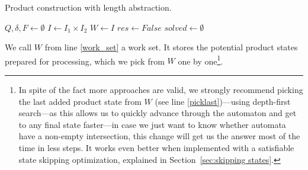 \begin{algorithm}[ht]
\caption{Product construction with length abstraction.}\label{productConstructionLengthAbstrAlg}
\DontPrintSemicolon
{}
\BlankLine
$Q, \delta, F \gets \emptyset$ \;
$I \gets I_1 \times I_2$ \;
$W \gets I$ \;\label{work_set}
$res \gets False$ \;\label{sat}
$solved \gets \emptyset$ \;\label{solved}
\end{algorithm}

We call $W$ from line \ref{work_set} a work set. It stores the potential product states prepared for processing, which we pick from $W$ one by one\footnote{In spite of the fact more approaches are valid, we strongly recommend picking the last added product state from $W$ (see line \ref{picklast})---using depth-first search---as this allows us to quickly advance through the automaton and get to any final state faster---in case we just want to know whether automata have a non-empty intersection, this change will get us the answer most of the time in less steps. It works even better when implemented with a satisfiable state skipping optimization, explained in Section~\ref{sec:skipping states}.}.

